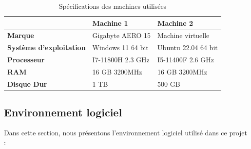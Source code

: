 \begin{table}[h!]
\centering
\caption{Spécifications des machines utilisées}
\label{tab:specs}
\begin{tabularx}{\linewidth}{|X|X|X|}
\hline
\textbf{} & \textbf{Machine 1} & \textbf{Machine 2} \\
\hline
\textbf{Marque} & Gigabyte AERO 15 & Machine virtuelle \\
\hline
\textbf{Système d’exploitation} & Windows 11 64 bit & Ubuntu 22.04 64 bit \\
\hline
\textbf{Processeur} & I7-11800H 2.3 GHz & I5-11400F 2.6 GHz \\
\hline
\textbf{RAM} & 16 GB 3200MHz & 16 GB 3200MHz \\
\hline
\textbf{Disque Dur} & 1 TB & 500 GB \\
\hline
\end{tabularx}
\end{table}
\subsection{Environnement logiciel}
Dans cette section, nous présentons l’environnement logiciel utilisé dans ce projet :

